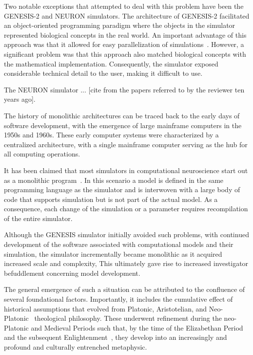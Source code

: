 \documentclass[11pt,3p,twocolumn]{JMN}
\begin{document}
Two notable exceptions that attempted to deal with this problem have been the GENESIS-2 and NEURON simulators.  The architecture of GENESIS-2 facilitated an object-oriented programming paradigm where the objects in the simulator represented biological concepts in the real world. An important advantage of this approach was that it allowed for easy parallelization of simulations~\citep{goddard97:_paral_genes}. However, a significant problem was that this approach also matched biological concepts with the mathematical implementation. Consequently, the simulator exposed considerable technical detail to the user, making it difficult to use.

The NEURON simulator ... [cite from the papers referred to by the reviewer ten years ago].

The history of monolithic architectures can be traced back to the early days of software development, with the emergence of large mainframe computers in the 1950s and 1960s. These early computer systems were characterized by a centralized architecture, with a single mainframe computer serving as the hub for all computing operations.

It has been claimed that most simulators in computational neuroscience start out as a monolithic program~\citep{cannon07:_inter}. In this scenario a model is defined in the same programming language as the simulator and is interwoven with a large body of code that supports simulation but is not part of the actual model. As a consequence, each change of the simulation or a parameter requires recompilation of the entire simulator.

Although the GENESIS simulator initially avoided such problems, with continued development of the software associated with computational models and their simulation, the simulator incrementally became monolithic as it acquired increased scale and complexity, This ultimately gave rise to increased investigator befuddlement concerning model development.

The general emergence of such a situation can be attributed to the confluence of several foundational factors. Importantly, it includes the cumulative effect of historical assumptions that evolved from Platonic, Aristotelian, and Neo-Platonic~\citep{parker99} theological philosophy. These underwent refinement during the neo-Platonic and Medieval Periods such that, by the time of the Elizabethan Period~\citep{tillyard17} and the subsequent Enlightenment~\citep{lovejoy48}, they develop into an increasingly and profound and culturally entrenched metaphysic.
\end{document}
